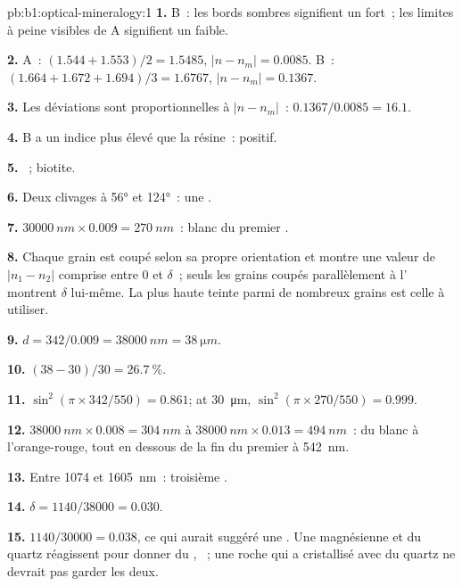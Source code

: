 \begin{solution}{pb:b1:optical-mineralogy:1}
\textbf{1.} B~: les bords sombres signifient un  fort~; les limites à peine
visibles de A signifient un  faible.

\textbf{2.} A~: $(1.544 + 1.553)/2 = 1.5485$, $|n - n_m| = 0.0085$. B~:
$(1.664 + 1.672 + 1.694)/3 = 1.6767$, $|n - n_m| = 0.1367$.

\textbf{3.} Les déviations sont proportionnelles à $|n - n_m|$~: $0.1367/0.0085 =
16.1$.

\textbf{4.} B a un indice plus élevé que la résine~:  positif.

\textbf{5.} ~; biotite.

\textbf{6.} Deux clivages à \ang{56} et \ang{124}~: une .

\textbf{7.} $\qty{30000}{nm}\times0.009 = \qty{270}{nm}$~: blanc du premier .

\textbf{8.} Chaque grain est coupé selon sa propre orientation et montre une
valeur de $|n_1 - n_2|$ comprise entre 0 et $\delta$~; seuls les grains coupés
parallèlement à l' montrent $\delta$ lui-même. La plus haute teinte
parmi de nombreux grains est celle à utiliser.

\textbf{9.} $d = 342/0.009 = \qty{38000}{nm} = \qty{38}{\micro m}$.

\textbf{10.} $(38 - 30)/30 = \qty{26.7}{\percent}$.

\textbf{11.} $\sin^2(\pi\times342/550) = 0.861$; at \qty{30}{\micro m},
$\sin^2(\pi\times270/550) = 0.999$.

\textbf{12.} $\qty{38000}{nm}\times0.008 = \qty{304}{nm}$ à
$\qty{38000}{nm}\times0.013 = \qty{494}{nm}$~: du blanc à l'orange-rouge, tout en
dessous de la fin du premier  à \qty{542}{nm}.

\textbf{13.} Entre 1074 et \qty{1605}{nm}~: troisième .

\textbf{14.} $\delta = 1140/38000 = 0.030$.

\textbf{15.} $1140/30000 = 0.038$, ce qui aurait suggéré une . Une 
magnésienne et du quartz réagissent pour donner du ,
~; une roche qui a cristallisé avec du quartz ne
devrait pas garder les deux.


\end{solution}
